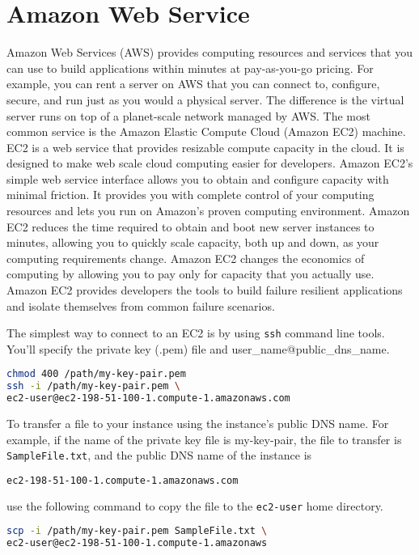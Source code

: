 \section{Amazon Web Service}

Amazon Web Services (AWS) provides computing resources and services that you can use to build applications within minutes at pay-as-you-go pricing. For example, you can rent a server on AWS that you can connect to, configure, secure, and run just as you would a physical server. The difference is the virtual server runs on top of a planet-scale network managed by AWS. The most common service is the Amazon Elastic Compute Cloud (Amazon EC2) machine. EC2 is a web service that provides resizable compute capacity in the cloud. It is designed to make web scale cloud computing easier for developers. Amazon EC2’s simple web service interface allows you to obtain and configure capacity with minimal friction. It provides you with complete control of your computing resources and lets you run on Amazon's proven computing environment. Amazon EC2 reduces the time required to obtain and boot new server instances to minutes, allowing you to quickly scale capacity, both up and down, as your computing requirements change. Amazon EC2 changes the economics of computing by allowing you to pay only for capacity that you actually use. Amazon EC2 provides developers the tools to build failure resilient applications and isolate themselves from common failure scenarios.

The simplest way to connect to an EC2 is by using \texttt{ssh} command line tools. You'll specify the private key (.pem) file and user\_name@public\_dns\_name. 
\begin{lstlisting}[language=bash]
chmod 400 /path/my-key-pair.pem
ssh -i /path/my-key-pair.pem \
ec2-user@ec2-198-51-100-1.compute-1.amazonaws.com
\end{lstlisting}

To transfer a file to your instance using the instance's public DNS name. For example, if the name of the private key file is my-key-pair, the file to transfer is	\texttt{SampleFile.txt}, and the public DNS name of the instance is \begin{lstlisting}[language=bash]
ec2-198-51-100-1.compute-1.amazonaws.com
\end{lstlisting} use the following command to copy the file to the \texttt{ec2-user} home directory.
\begin{lstlisting}[language=bash]
scp -i /path/my-key-pair.pem SampleFile.txt \
ec2-user@ec2-198-51-100-1.compute-1.amazonaws
\end{lstlisting}
